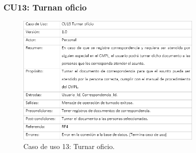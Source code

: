 		\subsubsection{CU13: Turnan oficio}
\begin{figure}[htbp!]
		\centering
			\includegraphics[width=0.8\textwidth]{images/CU/CU13}
		\caption{Caso de uso 13: Turnar oficio.}
		\label{Tabla}
	\end{figure}
	
